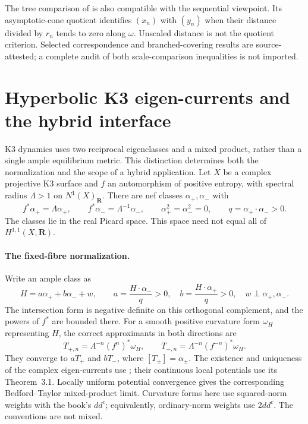 The tree comparison of \cite{Luo21LimitsV4,Luo21TreesV2} is also
compatible with the sequential viewpoint. Its asymptotic-cone quotient
identifies $(x_n)$ with $(y_n)$ when their distance divided by $r_n$
tends to zero along $\omega$. Unscaled distance is not the quotient
criterion. Selected correspondence
and branched-covering results are source-attested; a complete audit
of both scale-comparison inequalities is not imported.

\section{Hyperbolic K3 eigen-currents and the hybrid interface}
\label{sec:hybrid-K3-eigen-currents}

K3 dynamics uses two reciprocal eigenclasses and a mixed product,
rather than a single ample equilibrium metric. This distinction
determines both the normalization and the scope of a hybrid application.
Let $X$ be a complex projective K3 surface and $f$ an automorphism
of positive entropy, with spectral radius $\Lambda>1$ on
$N^1(X)_{\mathbf R}$. There are nef classes $\alpha_+,\alpha_-$ with
\[
 f^*\alpha_+=\Lambda\alpha_+,\qquad
 f^*\alpha_-=\Lambda^{-1}\alpha_-,\qquad
 \alpha_+^2=\alpha_-^2=0,\qquad
 q=\alpha_+\cdot\alpha_->0.
\tag{66.29u}\label{eq:hybrid-K3-eigenclasses}
\]
The classes lie in the real Picard space. This space need not equal
all of $H^{1,1}(X,\mathbf R)$.

\paragraph{The fixed-fibre normalization.}
Write an ample class as
\[
 H=a\alpha_++b\alpha_-+w,\qquad
 a=\frac{H\cdot\alpha_-}{q}>0,\quad
 b=\frac{H\cdot\alpha_+}{q}>0,\quad
 w\perp\alpha_+,\alpha_-.
\tag{66.29v}\label{eq:hybrid-K3-ample-decomposition}
\]
The intersection form is negative definite on this orthogonal
complement, and the powers of $f^*$ are bounded there. For a smooth
positive curvature form $\omega_H$ representing $H$, the correct
approximants in both directions are
\[
 T_{+,n}=\Lambda^{-n}(f^n)^*\omega_H,\qquad
 T_{-,n}=\Lambda^{-n}(f^{-n})^*\omega_H.
\tag{66.29w}\label{eq:hybrid-K3-symmetric-approximants}
\]
They converge to $aT_+$ and $bT_-$, where $[T_\pm]=\alpha_\pm$.
The existence and uniqueness of the complex eigen-currents use
\cite[Theorem~2.4]{Cantat01K3Published}; their continuous local
potentials use its Theorem~3.1. Locally uniform potential convergence
gives the corresponding Bedford--Taylor mixed-product limit. Curvature
forms here use squared-norm weights with the book's $dd^c$; equivalently,
ordinary-norm weights use $2dd^c$. The conventions are not mixed.


